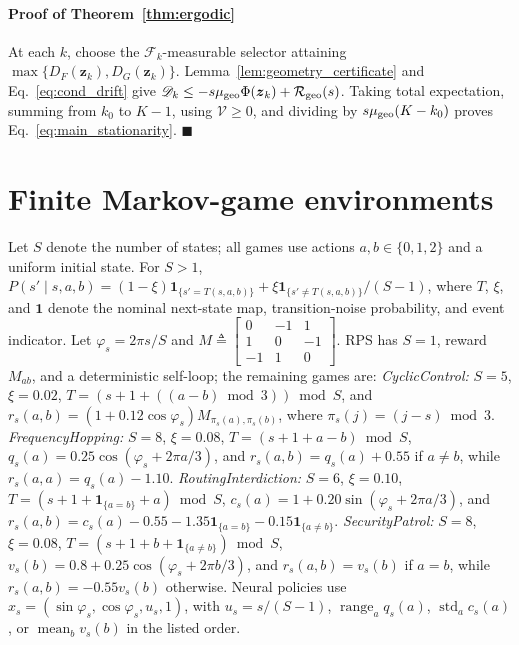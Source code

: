 \documentclass{article}
\theoremstyle{remark}
\newcommand{\bz}{\boldsymbol{z}}
\newcommand{\Vk}{\mathcal{V}}
\begin{document}
\paragraph{Proof of Theorem~\ref{thm:ergodic}}\label{app:ergodic}
At each $k$, choose the $\mathscr F_k$-measurable selector attaining $\max\{D_F(\bz_k),D_G(\bz_k)\}$.
Lemma~\ref{lem:geometry_certificate} and Eq.~\eqref{eq:cond_drift} give $\mathscr D_k\le-s\mu_{\rm geo}\Phi(\bz_k)+\mathcal R_{\rm geo}(s)$.
Taking total expectation, summing from $k_0$ to $K-1$, using $\Vk\ge0$, and dividing by $s\mu_{\rm geo}(K-k_0)$ proves Eq.~\eqref{eq:main_stationarity}.
\hfill$\blacksquare$

\section{Finite Markov-game environments}\label{app:environments}
Let $S$ denote the number of states; all games use actions $a,b\in\{0,1,2\}$ and a uniform initial state.
For $S>1$, $P(s'\mid s,a,b)=(1-\xi)\mathbf 1_{\{s'=T(s,a,b)\}}+\xi\mathbf 1_{\{s'\ne T(s,a,b)\}}/(S-1)$, where $T$, $\xi$, and $\mathbf 1$ denote the nominal next-state map, transition-noise probability, and event indicator.
Let $\varphi_s=2\pi s/S$ and $M\triangleq\left[\begin{smallmatrix}0&-1&1\\1&0&-1\\-1&1&0\end{smallmatrix}\right]$.
RPS has $S=1$, reward $M_{ab}$, and a deterministic self-loop; the remaining games are: \emph{CyclicControl:} $S=5$, $\xi=0.02$, $T=(s+1+((a-b)\bmod3))\bmod S$, and $r_s(a,b)=(1+0.12\cos\varphi_s)M_{\pi_s(a),\pi_s(b)}$, where $\pi_s(j)=(j-s)\bmod3$.
\emph{FrequencyHopping:} $S=8$, $\xi=0.08$, $T=(s+1+a-b)\bmod S$, $q_s(a)=0.25\cos(\varphi_s+2\pi a/3)$, and $r_s(a,b)=q_s(a)+0.55$ if $a\ne b$, while $r_s(a,a)=q_s(a)-1.10$.
\emph{RoutingInterdiction:} $S=6$, $\xi=0.10$, $T=(s+1+\mathbf 1_{\{a=b\}}+a)\bmod S$, $c_s(a)=1+0.20\sin(\varphi_s+2\pi a/3)$, and $r_s(a,b)=c_s(a)-0.55-1.35\mathbf 1_{\{a=b\}}-0.15\mathbf 1_{\{a\ne b\}}$.
\emph{SecurityPatrol:} $S=8$, $\xi=0.08$, $T=(s+1+b+\mathbf 1_{\{a\ne b\}})\bmod S$, $v_s(b)=0.8+0.25\cos(\varphi_s+2\pi b/3)$, and $r_s(a,b)=v_s(b)$ if $a=b$, while $r_s(a,b)=-0.55v_s(b)$ otherwise.
Neural policies use $x_s=(\sin\varphi_s,\cos\varphi_s,u_s,1)$, with $u_s=s/(S-1)$, $\operatorname{range}_{a}q_s(a)$, $\operatorname{std}_{a}c_s(a)$, or $\operatorname{mean}_{b}v_s(b)$ in the listed order.
\end{document}
